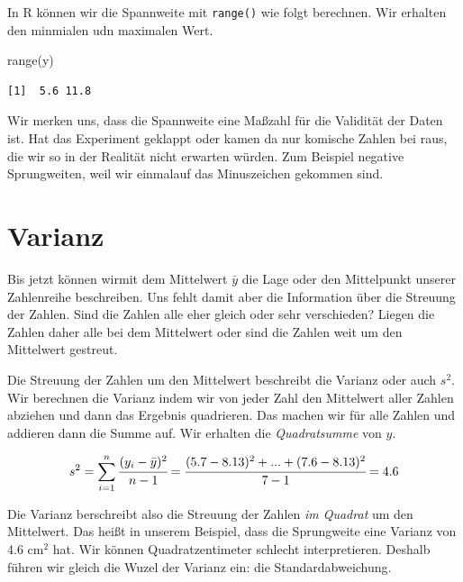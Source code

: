 \documentclass[
  letterpaper,
]{scrbook}
\newenvironment{Shaded}{\begin{snugshade}}{\end{snugshade}}
\newcommand{\FunctionTok}[1]{\textcolor[rgb]{0.28,0.35,0.67}{#1}}
\newcommand{\NormalTok}[1]{\textcolor[rgb]{0.00,0.23,0.31}{#1}}
\begin{document}
In R können wir die Spannweite mit \texttt{range()} wie folgt berechnen.
Wir erhalten den minmialen udn maximalen Wert.

\begin{Shaded}
\begin{Highlighting}[]
\FunctionTok{range}\NormalTok{(y) }
\end{Highlighting}
\end{Shaded}

\begin{verbatim}
[1]  5.6 11.8
\end{verbatim}

Wir merken uns, dass die Spannweite eine Maßzahl für die Validität der
Daten ist. Hat das Experiment geklappt oder kamen da nur komische Zahlen
bei raus, die wir so in der Realität nicht erwarten würden. Zum Beispiel
negative Sprungweiten, weil wir einmalauf das Minuszeichen gekommen
sind.

\hypertarget{varianz}{%
\section{Varianz}\label{varianz}}

Bis jetzt können wirmit dem Mittelwert \(\bar{y}\) die Lage oder den
Mittelpunkt unserer Zahlenreihe beschreiben. Uns fehlt damit aber die
Information über die Streuung der Zahlen. Sind die Zahlen alle eher
gleich oder sehr verschieden? Liegen die Zahlen daher alle bei dem
Mittelwert oder sind die Zahlen weit um den Mittelwert gestreut.

Die Streuung der Zahlen um den Mittelwert beschreibt die Varianz oder
auch \(s^2\). Wir berechnen die Varianz indem wir von jeder Zahl den
Mittelwert aller Zahlen abziehen und dann das Ergebnis quadrieren. Das
machen wir für alle Zahlen und addieren dann die Summe auf. Wir erhalten
die \emph{Quadratsumme} von \(y\).

{}

\[
s^2 = \sum_{i=1}^n\cfrac{(y_i - \bar{y})^2}{n-1} = \cfrac{(5.7 -
8.13)^2 + ... + (7.6 - 8.13)^2}{7-1} = 4.6
\]

Die Varianz berschreibt also die Streuung der Zahlen \emph{im Quadrat}
um den Mittelwert. Das heißt in unserem Beispiel, dass die Sprungweite
eine Varianz von 4.6 cm\(^2\) hat. Wir können Quadratzentimeter schlecht
interpretieren. Deshalb führen wir gleich die Wuzel der Varianz ein: die
Standardabweichung.
\end{document}
